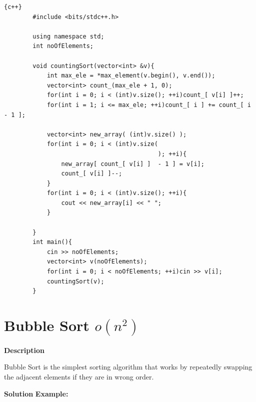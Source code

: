 \begin{lstlisting}{c++}
        #include <bits/stdc++.h>
        
        using namespace std;
        int noOfElements;
        
        void countingSort(vector<int> &v){
            int max_ele = *max_element(v.begin(), v.end());
            vector<int> count_(max_ele + 1, 0);
            for(int i = 0; i < (int)v.size(); ++i)count_[ v[i] ]++;
            for(int i = 1; i <= max_ele; ++i)count_[ i ] += count_[ i - 1 ];
        
            vector<int> new_array( (int)v.size() );
            for(int i = 0; i < (int)v.size(
                                           ); ++i){
                new_array[ count_[ v[i] ]  - 1 ] = v[i];
                count_[ v[i] ]--;
            }
            for(int i = 0; i < (int)v.size(); ++i){
                cout << new_array[i] << " ";
            }
        
        }
        int main(){
            cin >> noOfElements;
            vector<int> v(noOfElements);
            for(int i = 0; i < noOfElements; ++i)cin >> v[i];
            countingSort(v);
        }
\end{lstlisting}

\newpage

\section{Bubble Sort $o(n^2)$} 
\textbf{{\Large{Description}}}

Bubble Sort is the simplest sorting algorithm that works by repeatedly swapping the adjacent elements if they are in wrong order.\newline
    
\textbf{{\Large{Solution}}}\newline\newline
\textbf{{\large{Example:}}}\newline{}

